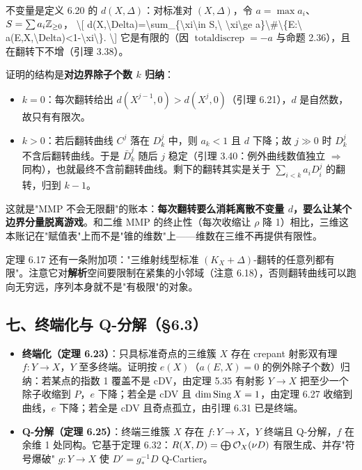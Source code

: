 不变量是定义 6.20 的 $d(X,\Delta)$：对标准对 $(X,\Delta)$，令 $a=\max a_i$、$S=\sum a_i\mathbb{Z}_{\ge0}$，
\textbackslash{}[
d(X,\textbackslash{}Delta)=\textbackslash{}sum\_\{\textbackslash{}xi\textbackslash{}in S,\textbackslash{} \textbackslash{}xi\textbackslash{}ge a\}\textbackslash{}\#\textbackslash{}\{E:\textbackslash{} a(E,X,\textbackslash{}Delta)<1-\textbackslash{}xi\textbackslash{}\}.
\textbackslash{}]
它是有限的（因 $\operatorname{totaldiscrep}=-a$ 与命题 2.36），且在翻转下不增（引理 3.38）。

证明的结构是\textbf{对边界除子个数 $k$ 归纳}：
\begin{itemize}
\item $k=0$：每次翻转给出 $d(X^{j-1},0)>d(X^j,0)$（引理 6.21），$d$ 是自然数，故只有有限次。
\item $k>0$：若后翻转曲线 $C^j$ 落在 $D^j_k$ 中，则 $a_k<1$ 且 $d$ 下降；故 $j\gg0$ 时 $D^j_k$ 不含后翻转曲线。于是 $\bar D^j_k$ 随后 $j$ 稳定（引理 3.40：例外曲线数值独立 $\Rightarrow$ 同构），也就最终不含前翻转曲线。剩下的翻转其实是关于 $\sum_{i<k}a_iD^j_i$ 的翻转，归到 $k-1$。
\end{itemize}

这就是"MMP 不会无限翻"的账本：\textbf{每次翻转要么消耗离散不变量 $d$，要么让某个边界分量脱离游戏}。和二维 MMP 的终止性（每次收缩让 $\rho$ 降 1）相比，三维这本账记在"赋值表"上而不是"锥的维数"上——维数在三维不再提供有限性。

定理 6.17 还有一条附加项："三维射线型标准 $(K_X+\Delta)$-翻转的任意列都有限"。注意它对\textbf{解析}空间要限制在紧集的小邻域（注意 6.18），否则翻转曲线可以跑向无穷远，序列本身就不是"有极限"的对象。

\subsection*{七、终端化与 Q-分解（\S6.3）}

\begin{itemize}
\item \textbf{终端化（定理 6.23）}：只具标准奇点的三维簇 $X$ 存在 crepant 射影双有理 $f:Y\to X$，$Y$ 至多终端。证明按 $e(X)$（$a(E,X)=0$ 的例外除子个数）归纳：若某点的指数 1 覆盖不是 cDV，由定理 5.35 有射影 $Y\to X$ 把至少一个除子收缩到 $P$，$e$ 下降；若全是 cDV 且 $\dim\operatorname{Sing} X=1$，由定理 6.27 收缩到曲线，$e$ 下降；若全是 cDV 且奇点孤立，由引理 6.31 已是终端。
\item \textbf{Q-分解（定理 6.25）}：终端三维簇 $X$ 存在 $f:Y\to X$，$Y$ 终端且 Q-分解，$f$ 在余维 1 处同构。它基于定理 6.32：$R(X,D)=\bigoplus\mathcal{O}_X(\nu D)$ 有限生成、并存"符号爆破" $g:Y\to X$ 使 $D'=g_*^{-1}D$ Q-Cartier。
\end{itemize}

